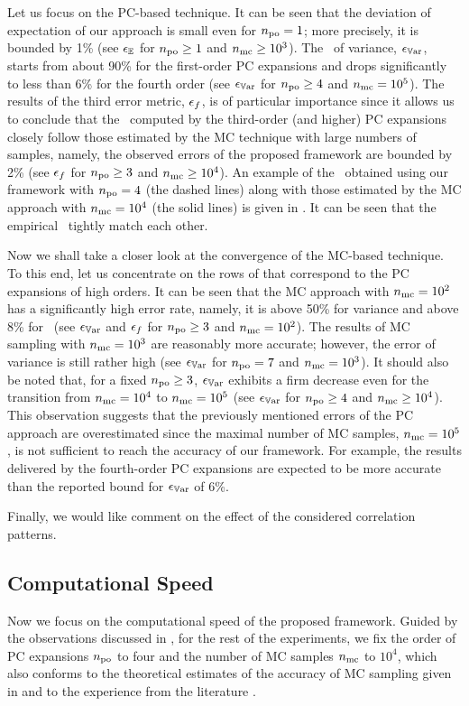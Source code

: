 Let us focus on the PC-based technique.
It can be seen that the deviation of expectation of our approach is small even for ${n_\text{po}} = 1$; more precisely, it is bounded by 1\% (see $\epsilon_\mathbb{E}$ for ${n_\text{po}} \geq 1$ and ${n_\text{mc}} \geq 10^3$).
The \nrmse\ of variance, $\epsilon_{\mathbb{V}\text{ar}}$, starts from about 90\% for the first-order PC expansions and drops significantly to less than 6\% for the fourth order (see $\epsilon_{\mathbb{V}\text{ar}}$ for ${n_\text{po}} \geq 4$ and ${n_\text{mc}} = 10^5$).
The results of the third error metric, $\epsilon_f$, is of particular importance since it allows us to conclude that the \pdfs\ computed by the third-order (and higher) PC expansions closely follow those estimated by the MC technique with large numbers of samples, namely, the observed errors of the proposed framework are bounded by 2\% (see $\epsilon_f$ for ${n_\text{po}} \geq 3$ and ${n_\text{mc}} \geq 10^4$).
An example of the \pdfs\ obtained using our framework with ${n_\text{po}} = 4$ (the dashed lines) along with those estimated by the MC approach with ${n_\text{mc}} = 10^4$ (the solid lines) is given in .
It can be seen that the empirical \pdfs\ tightly match each other.

Now we shall take a closer look at the convergence of the MC-based technique. To this end, let us concentrate on the rows of  that correspond to the PC expansions of high orders.
It can be seen that the MC approach with ${n_\text{mc}} = 10^2$ has a significantly high error rate, namely, it is above 50\% for variance and above 8\% for \pdfs\ (see $\epsilon_{\mathbb{V}\text{ar}}$ and $\epsilon_f$ for ${n_\text{po}} \geq 3$ and ${n_\text{mc}} = 10^2$).
The results of MC sampling with ${n_\text{mc}} = 10^3$ are reasonably more accurate; however, the error of variance is still rather high (see $\epsilon_{\mathbb{V}\text{ar}}$ for ${n_\text{po}} = 7$ and ${n_\text{mc}} = 10^3$).
It should also be noted that, for a fixed ${n_\text{po}} \geq 3$, $\epsilon_{\mathbb{V}\text{ar}}$ exhibits a firm decrease even for the transition from ${n_\text{mc}} = 10^4$ to ${n_\text{mc}} = 10^5$ (see $\epsilon_{\mathbb{V}\text{ar}}$ for ${n_\text{po}} \geq 4$ and ${n_\text{mc}} \geq 10^4$).
This observation suggests that the previously mentioned errors of the PC approach are overestimated since the maximal number of MC samples, ${n_\text{mc}} = 10^5$, is not sufficient to reach the accuracy of our framework.
For example, the results delivered by the fourth-order PC expansions are expected to be more accurate than the reported bound for $\epsilon_{\mathbb{V}\text{ar}}$ of 6\%.

Finally, we would like comment on the effect of the considered correlation patterns.

\subsection{Computational Speed}

Now we focus on the computational speed of the proposed framework.
Guided by the observations discussed in , for the rest of the experiments, we fix the order of PC expansions ${n_\text{po}}$ to four and the number of MC samples ${n_\text{mc}}$ to $10^4$, which also conforms to the theoretical estimates of the accuracy of MC sampling given in \cite{diaz-emparanza2002} and to the experience from the literature \cite{xiu2010, maitre2010, shen2009, eldred2008}.

